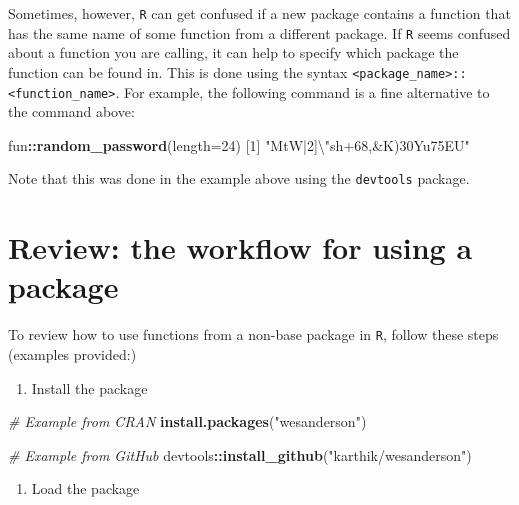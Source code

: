 \documentclass[
]{book}
\newenvironment{Shaded}{\begin{snugshade}}{\end{snugshade}}
\newcommand{\CharTok}[1]{\textcolor[rgb]{0.31,0.60,0.02}{#1}}
\newcommand{\CommentTok}[1]{\textcolor[rgb]{0.56,0.35,0.01}{\textit{#1}}}
\newcommand{\DataTypeTok}[1]{\textcolor[rgb]{0.13,0.29,0.53}{#1}}
\newcommand{\DecValTok}[1]{\textcolor[rgb]{0.00,0.00,0.81}{#1}}
\newcommand{\KeywordTok}[1]{\textcolor[rgb]{0.13,0.29,0.53}{\textbf{#1}}}
\newcommand{\NormalTok}[1]{#1}
\newcommand{\OperatorTok}[1]{\textcolor[rgb]{0.81,0.36,0.00}{\textbf{#1}}}
\newcommand{\StringTok}[1]{\textcolor[rgb]{0.31,0.60,0.02}{#1}}
\providecommand{\tightlist}{%
  \setlength{\itemsep}{0pt}\setlength{\parskip}{0pt}}
\begin{document}
Sometimes, however, \texttt{R} can get confused if a new package contains a function that has the same name of some function from a different package. If \texttt{R} seems confused about a function you are calling, it can help to specify which package the function can be found in. This is done using the syntax \texttt{\textless{}package\_name\textgreater{}::\textless{}function\_name\textgreater{}}. For example, the following command is a fine alternative to the command above:

\begin{Shaded}
\begin{Highlighting}[]
\NormalTok{fun}\OperatorTok{::}\KeywordTok{random_password}\NormalTok{(}\DataTypeTok{length=}\DecValTok{24}\NormalTok{)}
\NormalTok{[}\DecValTok{1}\NormalTok{] }\StringTok{"MtW|2]}\CharTok{\textbackslash{}"}\StringTok{sh+68,&K)30Yu75EU"}
\end{Highlighting}
\end{Shaded}

Note that this was done in the example above using the \texttt{devtools} package.

\hypertarget{review-the-workflow-for-using-a-package}{%
\section*{Review: the workflow for using a package}\label{review-the-workflow-for-using-a-package}}

To review how to use functions from a non-base package in \texttt{R}, follow these steps (examples provided:)

\begin{enumerate}
\def\labelenumi{\arabic{enumi}.}
\tightlist
\item
  Install the package
\end{enumerate}

\begin{Shaded}
\begin{Highlighting}[]
\CommentTok{# Example from CRAN}
\KeywordTok{install.packages}\NormalTok{(}\StringTok{"wesanderson"}\NormalTok{)}

\CommentTok{# Example from GitHub}
\NormalTok{devtools}\OperatorTok{::}\KeywordTok{install_github}\NormalTok{(}\StringTok{"karthik/wesanderson"}\NormalTok{)}
\end{Highlighting}
\end{Shaded}

\begin{enumerate}
\def\labelenumi{\arabic{enumi}.}
\setcounter{enumi}{1}
\tightlist
\item
  Load the package
\end{enumerate}
\end{document}
